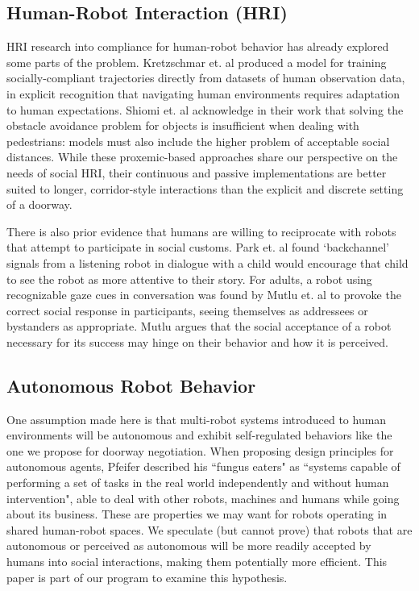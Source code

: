 \documentclass[letterpaper, 10 pt, conference]{ieeeconf}  %
\begin{document}
\subsection{Human-Robot Interaction (HRI)}
HRI research into compliance for human-robot behavior has already explored some parts of the problem. Kretzschmar et. al\cite{kretzschmar2016socially} produced a model for training socially-compliant trajectories directly from datasets of human observation data, in explicit recognition that navigating human environments requires adaptation to human expectations. Shiomi et. al\cite{shiomi2014towards} acknowledge in their work that solving the obstacle avoidance problem for objects is insufficient when dealing with pedestrians: models must also include the higher problem of acceptable social distances. While these proxemic-based approaches share our perspective on the needs of social HRI, their continuous and passive implementations are better suited to longer, corridor-style interactions than the explicit and discrete setting of a doorway.

There is also prior evidence that humans are willing to reciprocate with robots that attempt to participate in social customs. Park et. al\cite{park2017backchannel} found `backchannel' signals from a listening robot in dialogue with a child would encourage that child to see the robot as more attentive to their story. For adults, a robot using recognizable gaze cues in conversation was found by Mutlu et. al\cite{mutlu2009footing} to provoke the correct social response in participants, seeing themselves as addressees or bystanders as appropriate. Mutlu argues that the social acceptance of a robot necessary for its success may hinge on their behavior and how it is perceived.

\subsection{Autonomous Robot Behavior}

One assumption made here is that multi-robot systems introduced to human environments will be autonomous and exhibit self-regulated behaviors like the one we propose for doorway negotiation. When proposing design principles for autonomous agents\cite{pfeifer1996building}, Pfeifer described his ``fungus eaters" as ``systems capable of performing a set of tasks in the real world independently and without human intervention", able to deal with other robots, machines and humans while going about its business. These are properties we may want for robots operating in shared human-robot spaces. We speculate (but cannot prove) that robots that are autonomous or perceived as autonomous will be more readily accepted by humans into social interactions, making them potentially more efficient. This paper is part of our program to examine this hypothesis. 
\end{document}
